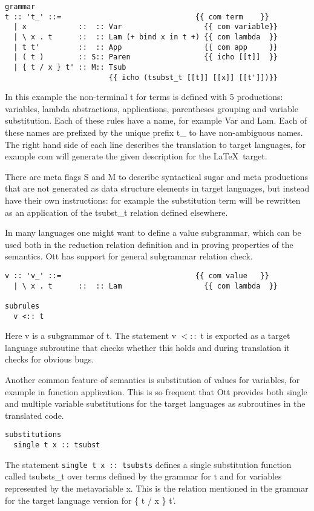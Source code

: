 \documentclass[12pt,twoside,notitlepage]{report}
\begin{document}
\begin{lstlisting}[language={Ott}, caption={Ott grammar example}]
grammar
t :: 't_' ::=                               {{ com term    }}
  | x            ::  :: Var                   {{ com variable}}
  | \ x . t      ::  :: Lam (+ bind x in t +) {{ com lambda  }}
  | t t'         ::  :: App                   {{ com app     }}
  | ( t )        :: S:: Paren                 {{ icho [[t]]  }} 
  | { t / x } t' :: M:: Tsub  
                        {{ icho (tsubst_t [[t]] [[x]] [[t']])}}
\end{lstlisting}

In this example the non-terminal t for terms is defined with 5 productions: variables, lambda abstractions, applications, parentheses grouping and variable substitution. Each of these rules have a name, for example Var and Lam. Each of these names are prefixed by the unique prefix t\_ to have non-ambiguous names. The right hand side of each line describes the translation to target languages, for example com will  generate the given description for the \LaTeX\, target. 

There are meta flags S and M to describe syntactical sugar and meta productions that are not generated as data structure elements in target languages, but instead have their own instructions: for example the substitution term will be rewritten as an application of the tsubst\_t relation defined elsewhere. 

In many languages one might want to define a value subgrammar, which can be used both in the reduction relation definition and in proving properties of the semantics. Ott has support for general subgrammar relation check.
\begin{lstlisting}[language={Ott}, caption={Ott value subgrammar example}]
v :: 'v_' ::=                               {{ com value   }}
  | \ x . t      ::  :: Lam                   {{ com lambda  }}
  
subrules
  v <:: t
\end{lstlisting}
Here v is a subgrammar of t. The statement v $<::$ t is exported as a target language subroutine that checks whether this holds and during translation it checks for obvious bugs.

Another common feature of semantics is substitution of values for variables, for example in function application. This is so frequent that Ott provides both single and multiple variable substitutions for the target languages as subroutines in the translated code.
\begin{lstlisting}[language={Ott}, caption={Ott substitution example}]
substitutions
  single t x :: tsubst 
\end{lstlisting}
The statement \lstinline[language={Ott}]|single t x :: tsubsts| defines a single substitution function called tsubsts\_t over terms defined by the grammar for t and for variables represented by the metavariable x. This is the relation mentioned in the grammar for the target language version for \{ t / x \} t'.
\end{document}
